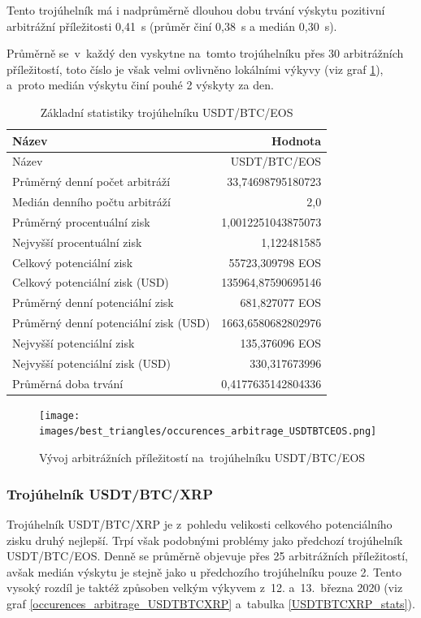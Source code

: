\documentclass[thesis=B,czech]{FITthesis}[2019/03/21]
\begin{document}
Tento trojúhelník má i nadprůměrně dlouhou dobu trvání výskytu pozitivní arbitrážní příležitosti 0,41~s (průměr činí 0,38~s a medián 0,30~s). 

Průměrně se~v~každý den vyskytne na~tomto trojúhelníku přes 30 arbitrážních příležitostí, toto číslo je však velmi ovlivněno lokálními výkyvy (viz graf \ref{occurences_arbitrage_USDTBTCEOS}), a~proto medián výskytu činí pouhé 2 výskyty za den.

\begin{table}\centering
\caption{Základní statistiky trojúhelníku USDT/BTC/EOS}
\label{USDTBTCEOS_stats}
\begin{tabular}{|| l | r ||}
\hline Název & Hodnota \\ 
\hline\hline Název & USDT/BTC/EOS \\ 
\hline Průměrný denní počet arbitráží & 33,74698795180723 \\ 
\hline Medián denního počtu arbitráží & 2,0 \\ 
\hline Průměrný procentuální zisk & 1,0012251043875073 \\ 
\hline Nejvyšší procentuální zisk & 1,122481585 \\ 
\hline Celkový potenciální zisk & 55723,309798 EOS \\ 
\hline Celkový potenciální zisk (USD) & 135964,87590695146 \\ 
\hline Průměrný denní potenciální zisk & 681,827077 EOS \\ 
\hline Průměrný denní potenciální zisk (USD) & 1663,6580682802976 \\ 
\hline Nejvyšší potenciální zisk & 135,376096 EOS \\ 
\hline Nejvyšší potenciální zisk (USD) & 330,317673996 \\ 
\hline Průměrná doba trvání & 0,4177635142804336 \\ 
\hline
\end{tabular}
\end{table}

\begin{figure}\centering
	\texttt{[image: images/best\_triangles/occurences\_arbitrage\_USDTBTCEOS.png]}
	\caption{Vývoj arbitrážních příležitostí na~trojúhelníku USDT/BTC/EOS }\label{occurences_arbitrage_USDTBTCEOS}
\end{figure}

\subsubsection{Trojúhelník USDT/BTC/XRP}
Trojúhelník USDT/BTC/XRP je z~pohledu velikosti celkového potenciálního zisku druhý nejlepší. Trpí však podobnými problémy jako předchozí trojúhelník USDT/BTC/EOS. Denně se průměrně objevuje přes 25 arbitrážních \linebreak příležitostí, avšak medián výskytu je stejně jako u předchozího trojúhelníku pouze 2. Tento vysoký rozdíl je taktéž způsoben velkým výkyvem z~12. \linebreak a~13.~března 2020 (viz graf \ref{occurences_arbitrage_USDTBTCXRP} a~tabulka \ref{USDTBTCXRP_stats}).
\end{document}
